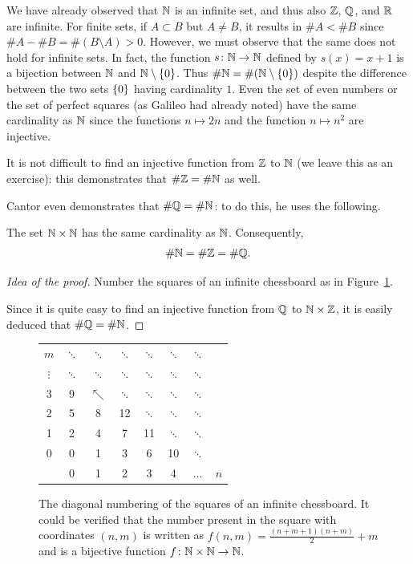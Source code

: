 We have already observed that ${\mathbb N}$ is an infinite set, and thus 
also ${\mathbb Z}$, ${\mathbb Q}$, and ${\mathbb R}$ are infinite.
For finite sets, if $A\subset B$ but $A\neq B$, it results in $\#A < \# B$
since $\#A - \#B = \#(B\setminus A) > 0$. 
However, we must observe that the same does not hold for infinite sets.
In fact, the function $s\colon {\mathbb N} \to {\mathbb N}$ defined by $s(x)=x+1$
is a bijection between ${\mathbb N}$ and ${\mathbb N}\setminus{\left\{ 0 \right\}}$. 
Thus $\#{\mathbb N} = \#({\mathbb N}\setminus{\left\{ 0 \right\}})$ 
despite the difference between the two sets ${\left\{ 0 \right\}}$ having 
cardinality $1$. 
Even the set of even numbers or the set 
of perfect squares (as Galileo had already noted)
have the same cardinality as ${\mathbb N}$ since the functions $n\mapsto 2n$
and the function $n\mapsto n^2$ are injective.

It is not difficult to find an injective function from ${\mathbb Z}$ to ${\mathbb N}$
(we leave this as an exercise): this demonstrates that $\#{\mathbb Z} = \# {\mathbb N}$ as well.

Cantor even demonstrates that $\#{\mathbb Q} = \#{\mathbb N}$: 
to do this, he uses the following.

\begin{theorem}
\label{th:Cantor_primo}%
%
The set ${\mathbb N} \times {\mathbb N}$ has the same cardinality as ${\mathbb N}$. Consequently,
\[
  \# {\mathbb N} = \# {\mathbb Z} = \# {\mathbb Q}.
  \]
\end{theorem}
%
\begin{proof}[Idea of the proof]
  Number the squares of an infinite chessboard
  as in Figure~\ref{fig:cantor1}.
  
  Since it is quite easy to find an injective function 
  from ${\mathbb Q}$ to ${\mathbb N} \times {\mathbb Z}$, it is easily deduced that $\#{\mathbb Q} = \#{\mathbb N}$.
\end{proof}

\begin{figure}
  \begin{tabular}{c|ccccccc}
   $m$ & $\ddots$ & $\ddots$ & $\ddots$ & $\ddots$ & $\ddots$ & $\ddots$\\
   $\vdots$ & $\ddots$ & $\ddots$ & $\ddots$ & $\ddots$ & $\ddots$ & $\ddots$\\
   3 & 9 & $\nwarrow$ & $\ddots$  & $\ddots$ & $\ddots$ & $\ddots$\\
   2 & 5 & 8 & 12 & $\ddots$  & $\ddots$ & $\ddots$\\
   1 & 2 & 4 & 7 & 11 & $\ddots$  & $\ddots$\\
   0 & 0 & 1 & 3 & 6 & 10 & $\ddots$ \\ \hline
     & 0 & 1 & 2 & 3 & 4 & $\dots$ & $n$
  \end{tabular}
  \caption{
    The diagonal numbering of the squares
    of an infinite chessboard. It could be verified
    that the number present in the square with coordinates $(n,m)$
    is written as $f(n,m) = \frac{(n+m+1)(n+m)}{2}+m$
    and is a bijective function $f\colon {\mathbb N}\times{\mathbb N} \to{\mathbb N}$.}
  \label{fig:cantor1}
\end{figure}


